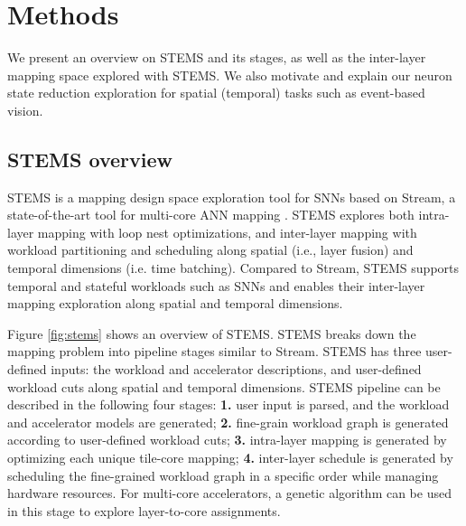 \section{Methods}
\label{sec:methods}
We present an overview on STEMS and its stages, as well as the inter-layer mapping space explored with STEMS. We also motivate and explain our neuron state reduction exploration for spatial (temporal) tasks such as event-based vision.



\subsection{STEMS overview}
\label{sec:ahm}


STEMS is a mapping design space exploration tool for SNNs based on Stream, a state-of-the-art tool for multi-core ANN mapping \cite{stream}. STEMS explores both intra-layer mapping with loop nest optimizations, and inter-layer mapping with workload partitioning and scheduling along spatial (i.e., layer fusion) and temporal dimensions (i.e. time batching). Compared to Stream, STEMS supports temporal and stateful workloads such as SNNs and enables their inter-layer mapping exploration along spatial and temporal dimensions.


Figure \ref{fig:stems} shows an overview of STEMS. STEMS breaks down the mapping problem into pipeline stages similar to Stream. STEMS has three user-defined inputs: the workload and accelerator descriptions, and user-defined workload cuts along spatial and temporal dimensions. STEMS pipeline can be described in the following four stages: \textbf{1.} user input is parsed, and the workload and accelerator models are generated; \textbf{2.} fine-grain workload graph is generated according to user-defined workload cuts; \textbf{3.} intra-layer mapping is generated by optimizing each unique tile-core mapping; \textbf{4.} inter-layer schedule is generated by scheduling the fine-grained workload graph in a specific order while managing hardware resources. For multi-core accelerators, a genetic algorithm can be used in this stage to explore layer-to-core assignments.

